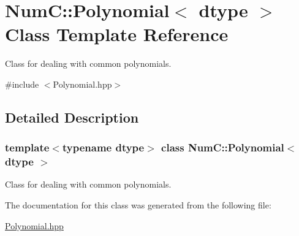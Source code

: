 \hypertarget{class_num_c_1_1_polynomial}{}\section{NumC\+:\+:Polynomial$<$ dtype $>$ Class Template Reference}
\label{class_num_c_1_1_polynomial}


Class for dealing with common polynomials.  




{\ttfamily \#include $<$Polynomial.\+hpp$>$}



\subsection{Detailed Description}
\subsubsection*{template$<$typename dtype$>$\newline
class Num\+C\+::\+Polynomial$<$ dtype $>$}

Class for dealing with common polynomials. 

The documentation for this class was generated from the following file\+:\begin{DoxyCompactItemize}
\item 
\mbox{\hyperlink{_polynomial_8hpp}{Polynomial.\+hpp}}\end{DoxyCompactItemize}
